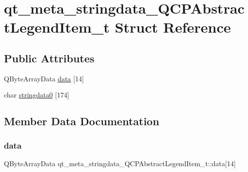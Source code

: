 \hypertarget{structqt__meta__stringdata___q_c_p_abstract_legend_item__t}{}\section{qt\+\_\+meta\+\_\+stringdata\+\_\+\+Q\+C\+P\+Abstract\+Legend\+Item\+\_\+t Struct Reference}
\label{structqt__meta__stringdata___q_c_p_abstract_legend_item__t}
\subsection*{Public Attributes}
\begin{DoxyCompactItemize}
\item 
Q\+Byte\+Array\+Data \mbox{\hyperlink{structqt__meta__stringdata___q_c_p_abstract_legend_item__t_afedc8a30b9d66c03673486e9c892c35b}{data}} \mbox{[}14\mbox{]}
\item 
char \mbox{\hyperlink{structqt__meta__stringdata___q_c_p_abstract_legend_item__t_a4987f6d279add0af922402e1f2e28b6b}{stringdata0}} \mbox{[}174\mbox{]}
\end{DoxyCompactItemize}


\subsection{Member Data Documentation}
\mbox{\label{structqt__meta__stringdata___q_c_p_abstract_legend_item__t_afedc8a30b9d66c03673486e9c892c35b}} 
\subsubsection{\texorpdfstring{data}{data}}
{\footnotesize\ttfamily Q\+Byte\+Array\+Data qt\+\_\+meta\+\_\+stringdata\+\_\+\+Q\+C\+P\+Abstract\+Legend\+Item\+\_\+t\+::data\mbox{[}14\mbox{]}}

\mbox{\label{structqt__meta__stringdata___q_c_p_abstract_legend_item__t_a4987f6d279add0af922402e1f2e28b6b}} 
